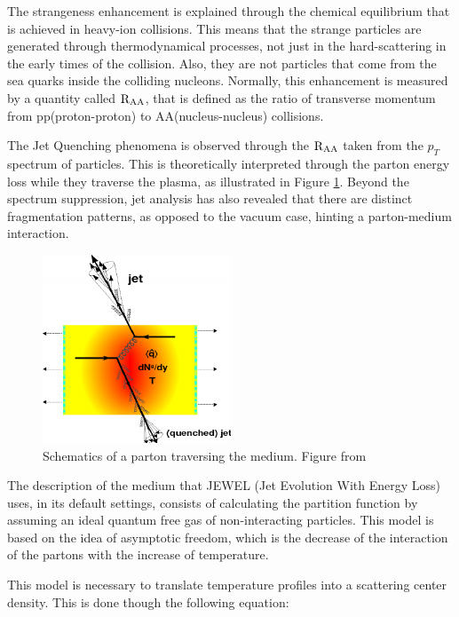 The strangeness enhancement is explained through the chemical equilibrium that is achieved in heavy-ion collisions\cite{letessier_hadrons_2002}. This means that the strange particles are generated through thermodynamical processes, not just in the hard-scattering in the early times of the collision. Also, they are not particles that come from the sea quarks inside the colliding nucleons. Normally, this enhancement is measured by a quantity called $ \rm R_{\rm AA} $, that is defined as the ratio of transverse momentum from pp(proton-proton) to AA(nucleus-nucleus) collisions.
\par
The Jet Quenching phenomena is observed through the $\rm R_{AA}$ taken from the $p_T$ spectrum of particles. This is theoretically interpreted through the parton energy loss while they traverse the plasma, as illustrated in Figure \ref{arrefecimento}. Beyond the spectrum suppression, jet analysis has also revealed that there are distinct fragmentation patterns, as opposed to the vacuum case, hinting a parton-medium interaction\cite{denterria_jet_2009}.

\begin{figure}
\includegraphics[width=0.5\textwidth]{images/quenching.png}
\caption[Schematics of a parton traversing the medium.]{Schematics of a parton traversing the medium. Figure from \cite{denterria_jet_2009}}
\label{arrefecimento}
\end{figure}

The description of the medium that JEWEL (Jet Evolution With Energy Loss) uses, in its default settings, consists of calculating the partition function by assuming an ideal quantum free gas of non-interacting particles. This model is based on the idea of asymptotic freedom, which is the decrease of the interaction of the partons with the increase of temperature.
\par
This model is necessary to translate temperature profiles into a scattering center density. This is done though the following equation\cite{bjorken_highly_1983,zapp_jet_2006}:

